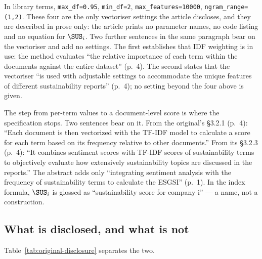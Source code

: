 In library terms, \texttt{max\_df=0.95}, \texttt{min\_df=2}, \texttt{max\_features=10000},
\texttt{ngram\_range=(1,2)}. These four are the only vectoriser settings the article
discloses, and they are described in prose only: the article prints no parameter names, no
code listing and no equation for $\SUS_i$. Two further sentences in the same paragraph bear
on the vectoriser and add no settings. The first establishes that IDF weighting is in use:
the method evaluates ``the relative importance of each term within the documents against the
entire dataset'' (p.~4). The second states that the vectoriser ``is used with adjustable
settings to accommodate the unique features of different sustainability reports'' (p.~4);
no setting beyond the four above is given.

The step from per-term values to a document-level score is where the specification stops.
Two sentences bear on it. From the original's \S3.2.1 (p.~4): ``Each document is then
vectorized with the TF-IDF model to calculate a score for each term based on its frequency
relative to other documents.'' From its \S3.2.3 (p.~4): ``It combines sentiment scores with TF-IDF scores of
sustainability terms to objectively evaluate how extensively sustainability topics are
discussed in the reports.'' The abstract adds only ``integrating sentiment analysis with
the frequency of sustainability terms to calculate the ESGSI'' (p.~1). In the index formula,
$\SUS_i$ is glossed as ``sustainability score for company i'' --- a name, not a
construction.

\subsection{What is disclosed, and what is not}

Table~\ref{tab:original-disclosure} separates the two.

